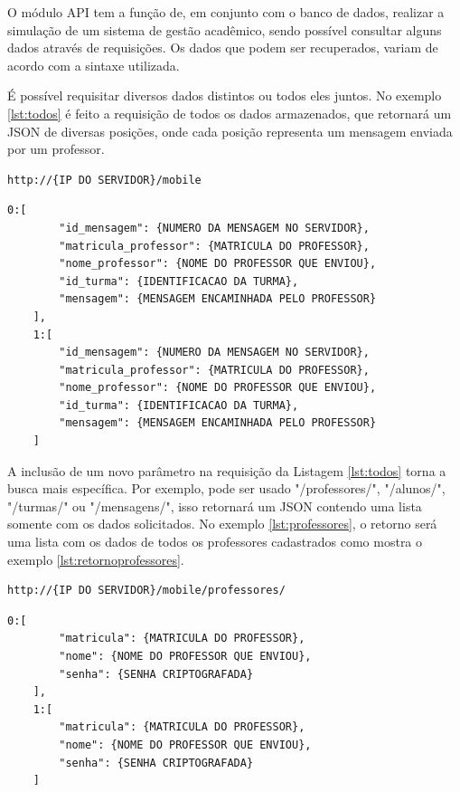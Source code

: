 O módulo API tem a função de, em conjunto com o banco de dados, realizar a simulação de um sistema de gestão acadêmico, sendo possível consultar alguns dados através de requisições. Os dados que podem ser recuperados, variam de acordo com a sintaxe utilizada.

É possível requisitar diversos dados distintos ou todos eles juntos. 
No exemplo \ref{lst:todos} é feito a requisição de todos os dados armazenados, que retornará um JSON de diversas posições, onde cada posição representa um mensagem enviada por um professor.
\begin{lstlisting}[caption={Requisitar todos os dados},label={lst:todos}]
	http://{IP DO SERVIDOR}/mobile
\end{lstlisting}

\begin{lstlisting}[caption={Retorno da requisição \ref{lst:todos}},label={lst:retornotodos}]
	0:[
		"id_mensagem": {NUMERO DA MENSAGEM NO SERVIDOR},
		"matricula_professor": {MATRICULA DO PROFESSOR},
		"nome_professor": {NOME DO PROFESSOR QUE ENVIOU},
		"id_turma": {IDENTIFICACAO DA TURMA},
		"mensagem": {MENSAGEM ENCAMINHADA PELO PROFESSOR}
	],
	1:[		
		"id_mensagem": {NUMERO DA MENSAGEM NO SERVIDOR},
		"matricula_professor": {MATRICULA DO PROFESSOR},
		"nome_professor": {NOME DO PROFESSOR QUE ENVIOU},
		"id_turma": {IDENTIFICACAO DA TURMA},
		"mensagem": {MENSAGEM ENCAMINHADA PELO PROFESSOR}
	]
\end{lstlisting}

A inclusão de um novo parâmetro na requisição da Listagem \ref{lst:todos} torna a busca mais específica. Por exemplo, pode ser usado "/professores/", "/alunos/", "/turmas/" ou "/mensagens/", isso retornará um JSON contendo uma lista somente com os dados solicitados. No exemplo \ref{lst:professores}, o retorno será uma lista com os dados de todos os professores cadastrados como mostra o exemplo \ref{lst:retornoprofessores}.

\begin{lstlisting}[caption={Requisitar lista de dados especifica},label={lst:professores}]
	http://{IP DO SERVIDOR}/mobile/professores/
\end{lstlisting}

\begin{lstlisting}[caption={Retorno da requisição \ref{lst:bd}},label={lst:retornoprofessores}]
	0:[
		"matricula": {MATRICULA DO PROFESSOR},
		"nome": {NOME DO PROFESSOR QUE ENVIOU},
		"senha": {SENHA CRIPTOGRAFADA}
	],
	1:[		
		"matricula": {MATRICULA DO PROFESSOR},
		"nome": {NOME DO PROFESSOR QUE ENVIOU},
		"senha": {SENHA CRIPTOGRAFADA}
	]
\end{lstlisting}

